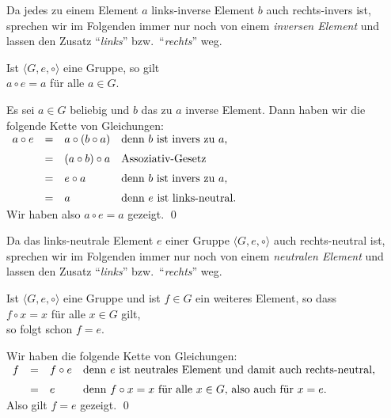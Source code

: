 \remark
Da jedes zu einem Element $a$ links-inverse Element $b$ auch rechts-invers ist, sprechen wir im Folgenden
immer nur noch von einem \emph{inversen Element} und lassen den Zusatz ``\emph{links}'' bzw.~``\emph{rechts}'' weg.
\eox

\begin{Satz} \lb
  Ist $\langle G, e, \circ \rangle$ eine Gruppe, so gilt
  \\[0.2cm]
  \hspace*{1.3cm}
  $a \circ e = a$ \quad für alle $a \in G$.
\end{Satz}

\proof
Es sei $a \in G$ beliebig und $b$ das zu $a$ inverse Element.  Dann haben wir die folgende Kette von
Gleichungen:
\\[0.2cm]
\hspace*{1.3cm}
$
\begin{array}[t]{lcll}
  a \circ e & = & a \circ (b \circ a) 
                & \mbox{denn $b$ ist invers zu $a$,} \\[0.2cm]
            & = & (a \circ b) \circ a
                & \mbox{Assoziativ-Gesetz} \\[0.2cm]
            & = & e \circ a
                & \mbox{denn $b$ ist invers zu $a$,} \\[0.2cm]
            & = & a 
                & \mbox{denn $e$ ist links-neutral.}
\end{array}
$
\\[0.2cm]
Wir haben also $a \circ e = a$ gezeigt. \qed

\remark
Da das links-neutrale Element $e$ einer Gruppe $\langle G, e, \circ \rangle$ auch rechts-neutral ist,
sprechen wir im Folgenden
immer nur noch von einem \emph{neutralen Element} und lassen den Zusatz ``\emph{links}'' bzw.~``\emph{rechts}'' weg.
\eox

\begin{Satz} \lb
  Ist $\langle G, e, \circ \rangle$ eine Gruppe und ist $f \in G$ ein weiteres  Element, so dass
  \\[0.2cm]
  \hspace*{1.3cm}
  $f \circ x = x$ \quad für alle $x \in G$ gilt,
  \\[0.2cm]
  so folgt schon $f = e$.
\end{Satz}

\proof
Wir haben die folgende Kette von Gleichungen:
\\[0.2cm]
\hspace*{1.3cm}
$
\begin{array}[t]{lcll}
  f & = & f \circ e & \mbox{denn $e$ ist neutrales Element und damit auch rechts-neutral,} \\[0.2cm]
    & = & e         & \mbox{denn $f \circ x = x$ für alle $x \in G$, also auch für $x = e$.} 
\end{array}
$
\\[0.2cm]
Also gilt $f = e$ gezeigt. \qed

